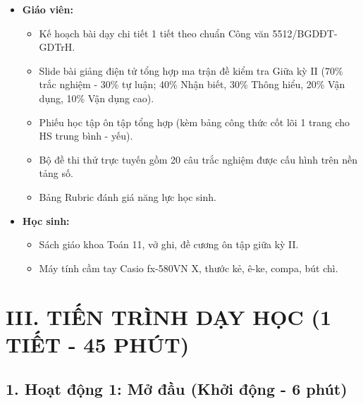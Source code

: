 \documentclass[12pt, a4paper]{article}
\begin{document}
\begin{itemize}[leftmargin=1.2cm]
    \item \textbf{Giáo viên:}
    \begin{itemize}[leftmargin=0.6cm]
        \item Kế hoạch bài dạy chi tiết 1 tiết theo chuẩn Công văn 5512/BGDĐT-GDTrH.
        \item Slide bài giảng điện tử tổng hợp ma trận đề kiểm tra Giữa kỳ II (70\% trắc nghiệm - 30\% tự luận; 40\% Nhận biết, 30\% Thông hiểu, 20\% Vận dụng, 10\% Vận dụng cao).
        \item Phiếu học tập ôn tập tổng hợp (kèm bảng công thức cốt lõi 1 trang cho HS trung bình - yếu).
        \item Bộ đề thi thử trực tuyến gồm 20 câu trắc nghiệm được cấu hình trên nền tảng số.
        \item Bảng Rubric đánh giá năng lực học sinh.
    \end{itemize}

    \item \textbf{Học sinh:}
    \begin{itemize}[leftmargin=0.6cm]
        \item Sách giáo khoa Toán 11, vở ghi, đề cương ôn tập giữa kỳ II.
        \item Máy tính cầm tay Casio fx-580VN X, thước kẻ, ê-ke, compa, bút chì.
    \end{itemize}
\end{itemize}

\section*{III. TIẾN TRÌNH DẠY HỌC (1 TIẾT - 45 PHÚT)}

\subsection*{1. Hoạt động 1: Mở đầu (Khởi động - 6 phút)}
\end{document}
